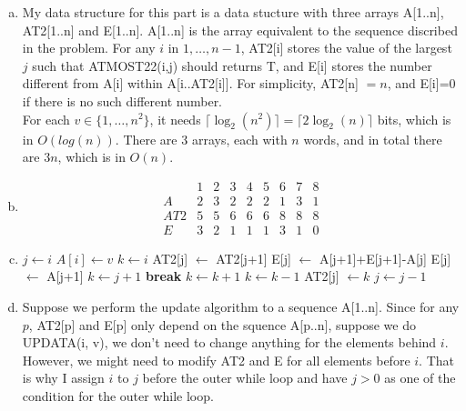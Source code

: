 \documentclass[10pt]{article}
\newcommand{\oor}{\mbox{ OR }}
\newcommand{\aand}{\mbox{ AND }}
\newcommand{\algorithmicbreak}{\textbf{break}}
\newcommand{\Break}{\State \algorithmicbreak}
\begin{document}
\begin{enumerate}[a.]
	\item %
		My data structure for this part is a data stucture with three arrays
		A[1..n], AT2[1..n] and E[1..n]. 
		A[1..n] is the array equivalent to the sequence discribed in the
		problem. 
		For any $i$ in $1, \ldots, n-1$, AT2[i] stores the value of the largest
		$j$ such that ATMOST22(i,j) should returns T, and E[i] stores the number
		different from A[i] within A[i..AT2[i]]. 
		For simplicity, AT2[n] $= n$, and E[i]=0 if there is no such different
		number. \\

		For each $v \in \{1, \ldots, n^2\}$, it needs $\lceil \log_2(n^2)
		\rceil = \lceil 2\log_2(n) \rceil$ bits, which is in $O(log (n))$. 
		There are 3 arrays, each with $n$ words, and in total there are $3n$,
		which is in $O(n)$. 

	\item %
		$$
		\begin{matrix}
				& 1 & 2 & 3 & 4 & 5 & 6 & 7 & 8 \\
			\hline
			A	& 2 & 3 & 2 & 2 & 2 & 1 & 3 & 1 \\
			AT2	& 5 & 5 & 6 & 6 & 6 & 8 & 8 & 8 \\
			E	& 3 & 2 & 1 & 1 & 1 & 3 & 1 & 0
		\end{matrix}
		$$
	\item %
		\begin{algorithmic}[1]
				\State $j \gets i$
				\State $A[i] \gets v$
				\State $k \gets i$
				\While{$j > 0 \aand k \geq i-1$}
						\If{A[j] = A[j+1] $\oor$ A[j] = E[j+1]}
							\State AT2[j] $\gets$ AT2[j+1]
							\State E[j] $\gets$ A[j+1]+E[j+1]-A[j]
						\Else
							\State E[j] $\gets$ A[j+1]
							\State $k \gets j+1$
								\If{A[k] $\neq$ A[j] $\aand$ A[k] $\neq$ E[j]}
									\Break
								\EndIf
								\State $k \gets k+1$
							\EndWhile
							\State $k \gets k-1$
							\State AT2[j] $\gets k$
						\EndIf
					\EndIf
					\State $j \gets j-1$
				\EndWhile
			\EndFunction
		\end{algorithmic}
	\item %
		Suppose we perform the update algorithm to a sequence A[1..n]. 
		Since for any $p$, AT2[p] and E[p] only depend on the squence A[p..n],
		suppose we do UPDATA(i, v), we don't need to change anything for the
		elements behind $i$. 
		However, we might need to modify AT2 and E for all elements before $i$.
		That is why I assign $i$ to $j$ before the outer while loop and have $j>0$
		as one of the condition for the outer while loop. 


\end{enumerate}
\end{document}
